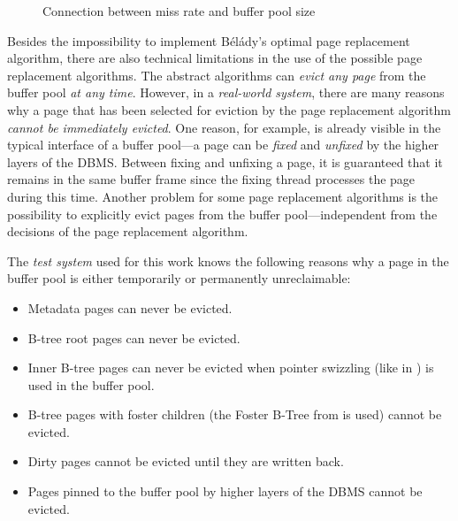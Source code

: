 \begin{@empty}
\begin{figure}[ht!]
{
        }
        \caption[Connection between miss rate and buffer pool size]{Connection between miss rate and buffer pool size \cite{Effelsberg:1984}}
        \label{fig:missratebufferpoolsize}
    \end{figure}
\end{@empty}

    Besides the impossibility to implement Bélády's optimal page replacement algorithm, there are also technical limitations in the use of the possible page replacement algorithms. The abstract algorithms can \emph{evict any page} from the buffer pool \emph{at any time}. However, in a \emph{real-world system}, there are many reasons why a page that has been selected for eviction by the page replacement algorithm \emph{cannot be immediately evicted}. One reason, for example, is already visible in the typical interface of a buffer pool---a page can be \emph{fixed} and \emph{unfixed} by the higher layers of the DBMS. Between fixing and unfixing a page, it is guaranteed that it remains in the same buffer frame since the fixing thread processes the page during this time. Another problem for some page replacement algorithms is the possibility to explicitly evict pages from the buffer pool---independent from the decisions of the page replacement algorithm.

    The \emph{test system} used for this work knows the following reasons why a page in the buffer pool is either temporarily or permanently unreclaimable:
    \begin{itemize}
        \item Metadata pages can never be evicted.
        \item B-tree root pages can never be evicted.
        \item Inner B-tree pages can never be evicted when pointer swizzling (like in \cite{Graefe:2014}) is used in the buffer pool.
        \item B-tree pages with foster children (the Foster B-Tree from \cite{Graefe:2012} is used) cannot be evicted.
        \item Dirty pages cannot be evicted until they are written back.
        \item Pages pinned to the buffer pool by higher layers of the DBMS cannot be evicted.
    \end{itemize}
    
